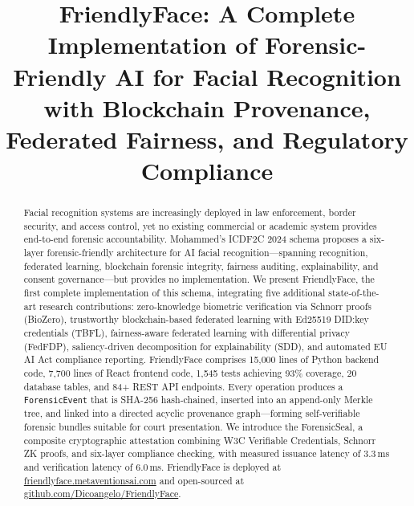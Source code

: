 \documentclass[conference]{IEEEtran}
\begin{document}
\title{FriendlyFace: A Complete Implementation of Forensic-Friendly AI for Facial Recognition with Blockchain Provenance, Federated Fairness, and Regulatory Compliance}

\author{
}

\maketitle

\begin{abstract}
Facial recognition systems are increasingly deployed in law enforcement, border security, and access control, yet no existing commercial or academic system provides end-to-end forensic accountability. Mohammed's ICDF2C 2024 schema proposes a six-layer forensic-friendly architecture for AI facial recognition---spanning recognition, federated learning, blockchain forensic integrity, fairness auditing, explainability, and consent governance---but provides no implementation. We present FriendlyFace, the first complete implementation of this schema, integrating five additional state-of-the-art research contributions: zero-knowledge biometric verification via Schnorr proofs (BioZero), trustworthy blockchain-based federated learning with Ed25519 DID:key credentials (TBFL), fairness-aware federated learning with differential privacy (FedFDP), saliency-driven decomposition for explainability (SDD), and automated EU AI Act compliance reporting. FriendlyFace comprises 15,000 lines of Python backend code, 7,700 lines of React frontend code, 1,545 tests achieving 93\% coverage, 20 database tables, and 84+ REST API endpoints. Every operation produces a \texttt{ForensicEvent} that is SHA-256 hash-chained, inserted into an append-only Merkle tree, and linked into a directed acyclic provenance graph---forming self-verifiable forensic bundles suitable for court presentation. We introduce the ForensicSeal, a composite cryptographic attestation combining W3C Verifiable Credentials, Schnorr ZK proofs, and six-layer compliance checking, with measured issuance latency of 3.3\,ms and verification latency of 6.0\,ms. FriendlyFace is deployed at \url{friendlyface.metaventionsai.com} and open-sourced at \url{github.com/Dicoangelo/FriendlyFace}.
\end{abstract}
\end{document}
